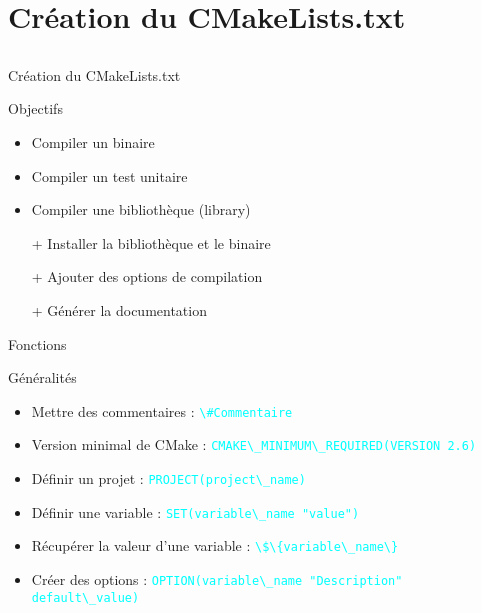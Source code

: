 \documentclass{beamer}
\begin{document}
\section{Création du CMakeLists.txt}
\subsection{}
\begin{frame}{Création du CMakeLists.txt}
  \begin{exampleblock}{Objectifs}
    \begin{itemize}
    \item Compiler un binaire
    \item Compiler un test unitaire
    \end{itemize}
  \end{exampleblock}
  \pause
  \begin{exampleblock}{}
    \begin{itemize}
    \item Compiler une bibliothèque (library)
    \item[+] Installer la bibliothèque et le binaire
    \item[+] Ajouter des options de compilation
    \item[+] Générer la documentation
    \end{itemize}
  \end{exampleblock}
\end{frame}

\begin{frame}[fragile]{Fonctions}
  \begin{block}{Généralités}
    \begin{itemize}
    \item Mettre des commentaires :\linebreak
      \textcolor{cyan}{\verb?\#Commentaire ?}
    \item Version minimal de CMake :\linebreak
      \textcolor{cyan}{\verb?CMAKE\_MINIMUM\_REQUIRED(VERSION 2.6)?}
    \item Définir un projet :\linebreak
      \textcolor{cyan}{\verb?PROJECT(project\_name)?}
    \item Définir une variable :\linebreak
      \textcolor{cyan}{\verb?SET(variable\_name "value")?}
    \item Récupérer la valeur d'une variable :\linebreak
      \textcolor{cyan}{\verb?\$\{variable\_name\}?}
    \item Créer des options :\linebreak
      \textcolor{cyan}{\verb?OPTION(variable\_name "Description" default\_value)?}
    \end{itemize}
  \end{block}
\end{frame}
\end{document}
